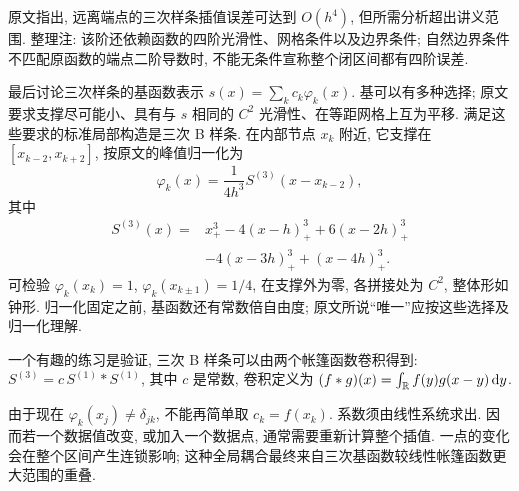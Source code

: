 原文指出, 远离端点的三次样条插值误差可达到 $O(h^4)$, 但所需分析超出讲义范围. 整理注: 该阶还依赖函数的四阶光滑性、网格条件以及边界条件; 自然边界条件不匹配原函数的端点二阶导数时, 不能无条件宣称整个闭区间都有四阶误差.

最后讨论三次样条的基函数表示 $s(x)=\sum_kc_k\varphi_k(x)$. 基可以有多种选择; 原文要求支撑尽可能小、具有与 $s$ 相同的 $C^2$ 光滑性、在等距网格上互为平移. 满足这些要求的标准局部构造是三次 B 样条. 在内部节点 $x_k$ 附近, 它支撑在 $[x_{k-2},x_{k+2}]$, 按原文的峰值归一化为
\[
\varphi_k(x)=\frac1{4h^3}S^{(3)}(x-x_{k-2}),
\]
其中
\begin{equation*}
\begin{split}
S^{(3)}(x)={}&x_+^3-4(x-h)_+^3+6(x-2h)_+^3\\
&-4(x-3h)_+^3+(x-4h)_+^3.
\end{split}
\end{equation*}
可检验 $\varphi_k(x_k)=1$, $\varphi_k(x_{k\pm1})=1/4$, 在支撑外为零, 各拼接处为 $C^2$, 整体形如钟形. 归一化固定之前, 基函数还有常数倍自由度; 原文所说“唯一”应按这些选择及归一化理解.

一个有趣的练习是验证, 三次 B 样条可以由两个帐篷函数卷积得到: $S^{(3)}=c\,S^{(1)}*S^{(1)}$, 其中 $c$ 是常数, 卷积定义为 $(f*g)(x)=\int_\mathbb R f(y)g(x-y)\,\mathrm d y$.

由于现在 $\varphi_k(x_j)\neq\delta_{jk}$, 不能再简单取 $c_k=f(x_k)$. 系数须由线性系统求出. 因而若一个数据值改变, 或加入一个数据点, 通常需要重新计算整个插值. 一点的变化会在整个区间产生连锁影响; 这种全局耦合最终来自三次基函数较线性帐篷函数更大范围的重叠.
